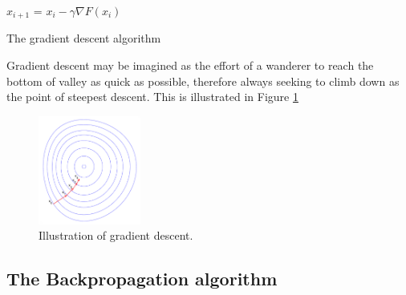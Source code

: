 \documentclass[10pt,a4paper,DIV=11]{scrreprt}
\begin{document}
\begin{algorithm}
\LinesNumbered
\DontPrintSemicolon
\BlankLine
{}
\BlankLine
\Begin
{
    {
        $x_{i+1}$ = $x_i - \gamma \nabla F(x_i)$
    }
}
\caption{The gradient descent algorithm}
\label{alg:GD}
\end{algorithm}

Gradient descent may be imagined as the effort of a wanderer to reach the bottom of valley as quick as possible, therefore always seeking to climb down as the point of steepest descent. This is illustrated in Figure \ref{fig:grad}

\begin{figure}
    \centering
    \includegraphics[width=0.3\textwidth,scale=1]{files/graddes.png}  
    \caption{Illustration of gradient descent.}%
    \label{fig:grad}
\end{figure}

\subsection{The Backpropagation algorithm}
\end{document}
